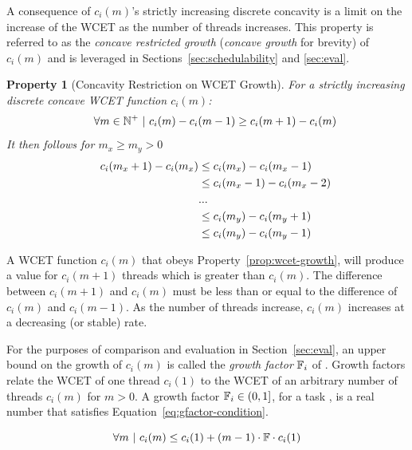 \documentclass[a4paper,UKenglish,cleveref,autoref,english]{lipics-v2019}
\newtheorem{prop}{Property}
\begin{document}
A consequence of ${c_i(m)}$'s strictly increasing discrete
concavity is a limit on the increase of the WCET as the number of
threads increases. This property is referred to as the
\emph{concave restricted growth} (\emph{concave growth} for brevity) of
${c_i(m)}$ and is leveraged in Sections~\ref{sec:schedulability} and
\ref{sec:eval}. 

\begin{prop}[Concavity Restriction on WCET Growth]
  \label{prop:ni-growth}
  For a strictly increasing discrete
  concave WCET function ${c_i(m)}$:
  \label{prop:wcet-growth}
  \begin{equation}
    \label{eq:wcet-growth}
    \indent
    \forall m \in \mathbb{N}^+~|~c_i(m) - c_i(m - 1) \ge c_i(m + 1) - c_i(m)
  \end{equation}
  It then follows for ${m_x \ge m_y > 0}$
  \begin{align*}
    \indent
    c_i(m_x + 1) - c_i(m_x) &\le c_i(m_x) - c_i(m_x - 1) \\
    &\le c_i(m_x - 1) - c_i(m_x - 2) \\
    &... \\
    &\le c_i(m_y) - c_i(m_y + 1) \\
    &\le c_i(m_y) - c_i(m_y - 1)
  \end{align*}
\end{prop}


A WCET function ${c_i(m)}$ that obeys Property~\ref{prop:wcet-growth},
will produce a value for ${c_i(m+1)}$ threads which is greater than
${c_i(m)}$. The difference between ${c_i(m+1)}$ and ${c_i(m)}$ must be less
than or equal to the difference of ${c_i(m)}$ and ${c_i(m-1)}$. As the
number of threads increase, ${c_i(m)}$ increases at a decreasing (or
stable) rate. 

For the purposes of comparison and evaluation in
Section~\ref{sec:eval}, an upper bound on the growth of ${c_i(m)}$
is called the \emph{growth factor} ${\mathbb{F}_i{}}$ of . 
Growth factors relate the WCET of one thread ${c_i(1)}$ to 
the WCET of an arbitrary number of threads ${c_i(m)}$ for ${m > 0}$.
A growth factor ${\mathbb{F}_i{} \in (0,1]}$, for a task , is a
real number that satisfies Equation~\ref{eq:gfactor-condition}.  

\begin{definition}
  \begin{equation}
    \label{eq:gfactor-condition}
    \forall{m}~|~ c_i(m) \le c_i(1) + (m - 1) \cdot \mathbb{F}{} \cdot c_i(1)
  \end{equation}
\end{definition}
\end{document}
